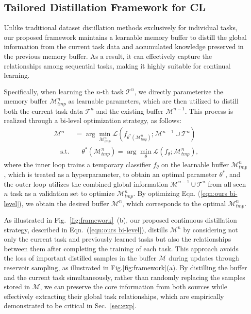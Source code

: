 \documentclass[table, xcdraw]{article}
\theoremstyle{plain}
\theoremstyle{definition}
\theoremstyle{remark}
\begin{document}
\vspace{-2mm}
\subsection{Tailored Distillation Framework for CL}
\label{sec: overall_framwork}
Unlike traditional dataset distillation methods exclusively for individual tasks, our proposed framework maintains a learnable memory buffer to distill the global information from
the current task data and accumulated knowledge preserved in the previous memory buffer. As a result, it can effectively capture the relationships among sequential tasks, making it highly suitable for continual learning.

Specifically, when learning the $n$-th task $\mathcal{T}^n$, we directly parameterize the memory buffer $\mathcal M^n_{tmp}$ as learnable parameters, which are then utilized to distill both the current task data $\mathcal T^{n}$ and the existing buffer $\mathcal M^{n-1}$. 
This process is realized through a bi-level optimization strategy, as follows:
\begin{equation}
\begin{aligned} 
\mathcal{M}^{n} &= \arg\min_{\mathcal M^n_{tmp}} \mathcal{L}(f_{\theta^*(\mathcal M^n_{tmp})};\mathcal M^{n-1} \cup\mathcal{T}^n) \\
    \quad  \text{s.t.} & \quad\theta^*(\mathcal M^n_{tmp}) = \arg\min_{\theta} \mathcal{L}(f_{\theta} ; \mathcal M^n_{tmp}),
    \label{eqn:ours bi-level}
\end{aligned}
\end{equation}
where the inner loop trains a temporary classifier $f_{\theta}$ on the learnable buffer $\mathcal M^n_{tmp}$, which is treated as a hyperparameter, to obtain an optimal parameter $\theta^*$, and the outer loop utilizes the combined global information $\mathcal M^{n-1}\cup \mathcal T^n$ from all seen $n$ task as a validation set to optimize $\mathcal M^n_{tmp}$. By optimizing Eqn. (\ref{eqn:ours bi-level}), we obtain the desired buffer $\mathcal M^n$, which corresponds to the optimal $\mathcal M^n_{tmp}$.

As illustrated in Fig.~\ref{fig:framework}~(b), our proposed continuous distillation strategy, described in Eqn.~(\ref{eqn:ours bi-level}), distills $\mathcal{M}^n$ by considering not only the current task and previously learned tasks but also the relationships between them after completing the training of each task. 
This approach avoids the loss of important distilled samples in the buffer $\mathcal{M}$ during updates through reservoir sampling, as illustrated in Fig.\ref{fig:framework}(a). By distilling the buffer and the current task simultaneously, rather than randomly replacing the samples stored in $\mathcal{M}$, we can preserve the core information from both sources while effectively extracting their global task relationships, which are empirically demonstrated to be critical in Sec.~\ref{sec:exp}.
\end{document}
